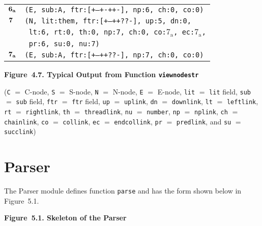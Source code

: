 \documentclass{article}
\begin{document}
\begin{minipage}{\textwidth}
{\begin{tabular}{|r|l|}
    ${\textbf{\textrm{6}}_{\textbf{\textrm{a}}}}$ & \texttt{\texttt{(E,~sub:A,~ftr:[+--+-++-],~np:6,~ch:0,~co:0)}} \\
    ${\textbf{\textrm{7}}_{\phantom{z}}}$ & \texttt{\texttt{(N,~lit:them,~ftr:[+--++??-],~up:5,~dn:0,}} \\
    & \texttt{\texttt{~lt:6,~rt:0,~th:0,~np:7,~ch:0,~co:${\textrm{7}_{\textrm{a}}}$,~ec:${\textrm{7}_{\textrm{a}}}$,}} \\
    & \texttt{\texttt{~pr:6,~su:0,~nu:7)}} \\
    ${\textbf{\textrm{7}}_{\textbf{\textrm{a}}}}$ & \texttt{\texttt{(E,~sub:A,~ftr:[+--++??-],~np:7,~ch:0,~co:0)}} \\
    \hline
  \end{tabular}
  }
\bigbreak
\textbf{Figure~4.7. Typical Output from Function \texttt{viewnodestr}}
\end{minipage}
\bigbreak
\noindent(\texttt{C} ${=}$ C-node, \texttt{S} ${=}$ S-node, \texttt{N}
${=}$ N-node, \texttt{E} ${=}$ E-node, \texttt{lit} ${=}$
\texttt{lit} field, \texttt{sub} ${=}$ \texttt{sub} field,
\texttt{ftr} ${=}$ \texttt{ftr} field, \texttt{up} ${=}$
\texttt{uplink}, \texttt{dn} ${=}$ \texttt{downlink},
\texttt{lt} ${=}$ \texttt{leftlink}, \texttt{rt} ${=}$
\texttt{rightlink}, \texttt{th} ${=}$ \texttt{threadlink},
\texttt{nu} ${=}$ \texttt{number}, \texttt{np} ${=}$
\texttt{nplink}, \texttt{ch} ${=}$ \texttt{chainlink},
\texttt{co} ${=}$ \texttt{collink}, \texttt{ec} ${=}$
\texttt{endcollink}, \texttt{pr} ${=}$ \texttt{predlink}, and
\texttt{su} ${=}$ \texttt{succlink})

%
%

\section{Parser}

The Parser module defines function \texttt{parse} and has the
form shown below in Figure~5.1.

\bigbreak
\begin{minipage}{\textwidth}
\vbox{}
\bigbreak
{}
\textbf{Figure~5.1. Skeleton of the Parser}
\end{minipage}
\bigbreak
\end{document}

